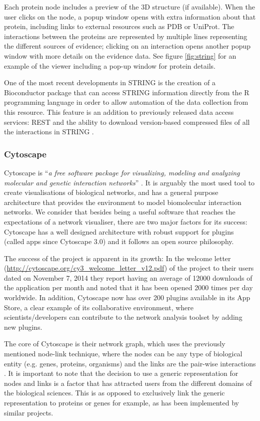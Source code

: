Each protein node includes a preview of the 3D structure (if available). When the user clicks on the node, a popup window opens with extra information about that protein, including links to external resources such as PDB or UniProt. The interactions between the proteins are represented by multiple lines representing the different sources of evidence; clicking on an interaction opens another popup window with more details on the evidence data. See figure \ref{fig:string} for an example of the viewer including a pop-up window for protein details.

One of the most recent developments in STRING is the creation of a Bioconductor package that can access STRING information directly from the R programming language in order to allow automation of the data collection from this resource. This feature is an addition to previously released  data access services: REST and the ability to download version-based compressed files of all the interactions in STRING \cite{SZK2014}.

\subsubsection{Cytoscape}
Cytoscape is ``\emph{a free software package for visualizing, modeling and analyzing molecular and genetic interaction networks}'' \cite{CLI2007}. It is arguably the most used tool to create visualisations of biological networks, and has a general purpose architecture that provides the environment to model biomolecular interaction networks. We consider that besides being a useful software that reaches the expectations of a network visualiser, there are two major factors for its success: Cytoscape has a well designed architecture with robust support for plugins (called apps since Cytoscape 3.0) and it follows an open source philosophy.

The success of the project is apparent in its growth: In the welcome letter (\url{http://cytoscape.org/cy3_welcome_letter_v12.pdf}) of the project to their users dated on November 7, 2014 they report having an average of 12000 downloads of the application per month and noted that it has been opened 2000 times per day worldwide. In addition, Cytoscape now has over 200 plugins available in its App Store, a clear example of its collaborative environment, where scientists/developers can contribute to the network analysis toolset by adding new plugins.

The core of Cytoscape is their network graph, which uses the previously mentioned node-link technique, where the nodes can be any type of biological entity (e.g. genes, proteins, organisms) and the links are the pair-wise interactions \cite{SHA2003}. It is important to note that the decision to use a generic representation for nodes and links is a factor that has attracted users from the different domains of the biological sciences. This is as opposed to exclusively link the generic representation to proteins or genes for example, as has been implemented by similar projects.

